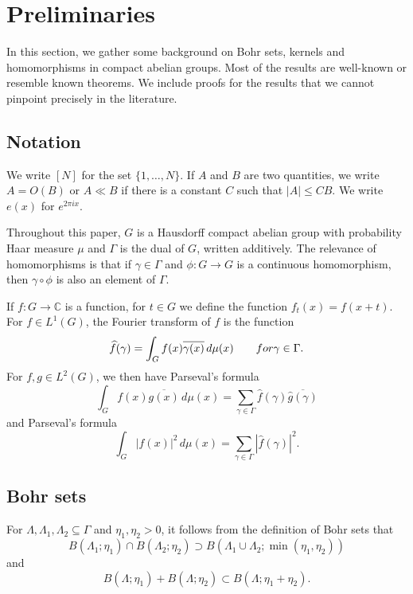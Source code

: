 \documentclass[10pt]{article}
\theoremstyle{definition}
\newcommand{\C}{\mathbb{C}}
\begin{document}
\section{Preliminaries}
\label{sec:prelim}
In this section, we gather some background on Bohr sets, kernels and homomorphisms in compact abelian groups. Most of the results are well-known or resemble known theorems. We include proofs for the results that we cannot pinpoint precisely in the literature. 


\subsection{Notation} We write $[N]$ for the set $\{ 1, \ldots, N\}$. If $A$ and $B$ are two quantities, we write $A = O(B)$ or $A \ll B$ if there is a constant $C$ such that $|A| \leq CB$. We write $e(x)$ for $e^{2 \pi i x}$.

Throughout this paper, $G$ is a Hausdorff compact abelian group with probability Haar measure $\mu$ and  $\Gamma$ is the dual of $G$, written additively. The relevance of homomorphisms is that if $\gamma \in \Gamma$ and $\phi:G \rightarrow G$ is a continuous homomorphism, then $\gamma \circ \phi$ is also an element of $\Gamma$.

If $f: G \rightarrow \C$ is a function, for $t \in G$ we define the function $f_t(x) = f(x+t)$. 
For $f \in L^1(G)$, the Fourier transform of $f$ is the function
\[
\widehat{f} (\gamma) = \int_{G} f(x) \overline{\gamma (x)} \, d\mu(x) \qquad \textup{ for } \gamma \in \Gamma.
\]
For $f, g \in L^2(G)$, we then have Parseval's formula
\[
\int_{G} f(x) \overline{g(x)} \, d\mu(x) = \sum_{\gamma \in \Gamma} \widehat{f} (\gamma) \overline{ \widehat{g} (\gamma) }
\]
and Parseval's formula
\[
\int_{G} |f(x)|^2 \, d\mu(x) = \sum_{\gamma \in \Gamma} \left| \widehat{f} (\gamma) \right|^2.
\]


\subsection{Bohr sets} 
For $\Lambda, \Lambda_1, \Lambda_2 \subseteq \Gamma$ and $\eta_1, \eta_2 > 0$, it follows from the definition of Bohr sets that 
\[
    B(\Lambda_1; \eta_1) \cap B(\Lambda_2; \eta_2) \supset B(\Lambda_1 \cup \Lambda_2; \min(\eta_1, \eta_2))
\]
and
\[
    B(\Lambda; \eta_1) + B(\Lambda; \eta_2) \subset B(\Lambda; \eta_1 + \eta_2).
\]
\end{document}

